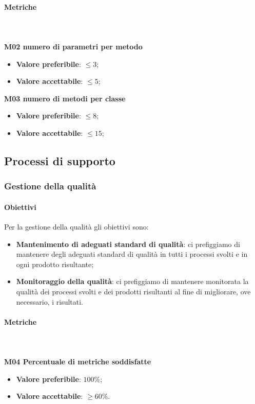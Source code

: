 			\paragraph{Metriche} \mbox{} \\ \\
			\textbf{M02 numero di parametri per metodo} 
			\begin{itemize}
				\item \textbf{Valore preferibile}: $ \le 3$;
				\item \textbf{Valore accettabile}: $ \le 5$;
			\end{itemize}			
			\textbf{M03 numero di metodi per classe} 
			\begin{itemize}
				\item \textbf{Valore preferibile}: $ \le 8$;
				\item \textbf{Valore accettabile}: $ \le 15$;
			\end{itemize}
	
			
	\subsection{Processi di supporto}			
		\subsubsection{Gestione della qualità}
			\paragraph{Obiettivi}
			Per la gestione della qualità gli obiettivi sono:
			\begin{itemize}
				\item \textbf{Mantenimento di adeguati standard di qualità}: ci prefiggiamo di mantenere degli adeguati standard di qualità in tutti i processi svolti e in ogni prodotto risultante;
				\item \textbf{Monitoraggio della qualità}: ci prefiggiamo di mantenere monitorata la qualità dei processi svolti e dei prodotti risultanti al fine di migliorare, ove necessario, i risultati.
			\end{itemize}	 
			\paragraph{Metriche} \mbox{} \\ \\
				\textbf{M04 Percentuale di metriche soddisfatte}
				\begin{itemize}
					\item \textbf{Valore preferibile}: $100\%$;
					\item \textbf{Valore accettabile}: $\ge 60\%$.
				\end{itemize}
			

